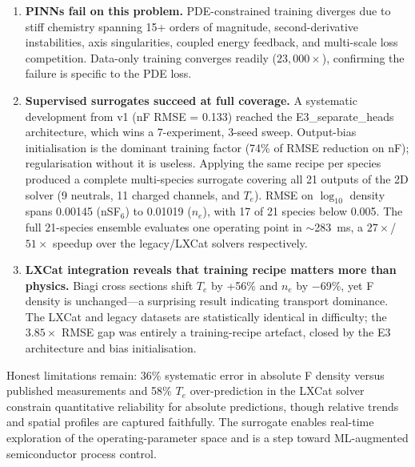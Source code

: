 \documentclass[12pt,a4paper]{article}
\begin{document}
\begin{enumerate}
  \item \textbf{PINNs fail on this problem.}  PDE-constrained training
        diverges due to stiff chemistry spanning 15+ orders of
        magnitude, second-derivative instabilities, axis singularities,
        coupled energy feedback, and multi-scale loss competition.
        Data-only training converges readily ($23{,}000\times$),
        confirming the failure is specific to the PDE loss.

  \item \textbf{Supervised surrogates succeed at full coverage.}
        A systematic development from v1 (nF RMSE = 0.133) reached the
        E3\_separate\_heads architecture, which wins a 7-experiment,
        3-seed sweep.  Output-bias initialisation is the dominant
        training factor (74\% of RMSE reduction on nF); regularisation
        without it is useless.  Applying the same recipe per species
        produced a complete multi-species surrogate covering all 21
        outputs of the 2D solver (9 neutrals, 11 charged channels,
        and $T_e$).  RMSE on $\log_{10}$ density spans 0.00145
        (nSF$_6$) to 0.01019 ($n_e$), with 17 of 21 species below
        0.005.  The full 21-species ensemble evaluates one operating
        point in $\sim$\SI{283}{\milli\second}, a $27\times$/$51\times$
        speedup over the legacy/LXCat solvers respectively.

  \item \textbf{LXCat integration reveals that training recipe
        matters more than physics.}  Biagi cross sections shift $T_e$
        by +56\% and $n_e$ by $-$69\%, yet F density is unchanged---a
        surprising result indicating transport dominance.  The LXCat
        and legacy datasets are statistically identical in difficulty;
        the $3.85\times$ RMSE gap was entirely a training-recipe
        artefact, closed by the E3 architecture and bias
        initialisation.
\end{enumerate}

Honest limitations remain: 36\% systematic error in absolute F density
versus published measurements and 58\% $T_e$ over-prediction in the
LXCat solver constrain quantitative reliability for absolute
predictions, though relative trends and spatial profiles are captured
faithfully.  The surrogate enables real-time exploration of the
operating-parameter space and is a step toward ML-augmented
semiconductor process control.

\end{document}
